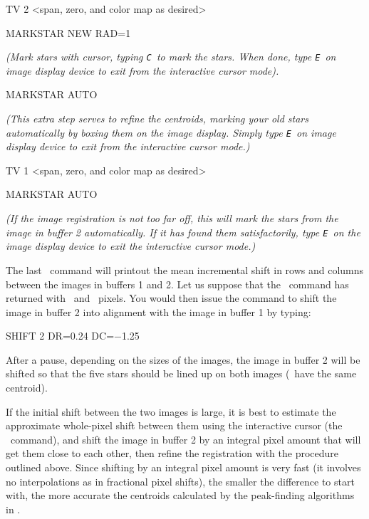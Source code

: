 \begin{command}
      \item TV 2 <span, zero, and color map as desired>
      \item MARKSTAR NEW RAD=1

            {\it (Mark stars with cursor, typing {\tt C}\ to mark
            the stars.  When done, type {\tt E}\ on image display device to 
            exit from the interactive cursor mode).}
      \item MARKSTAR AUTO

            {\it (This extra step serves to refine the centroids, marking 
            your old stars automatically by boxing them on the image
            display.  Simply type {\tt E}\ on image display device 
            to exit from the interactive cursor mode.)}
      \item TV 1 <span, zero, and color map as desired>
      \item MARKSTAR AUTO

            {\it (If the image registration is not too far off, this
            will mark the stars from the image in buffer 2 automatically.
            If it has found them satisfactorily, type {\tt E}\ on the
            image display device to exit the interactive cursor mode.)}
\end{command}
The last \ command will printout the mean incremental shift
in rows and columns between the images in buffers 1 and 2. Let us suppose that
the \ command has returned with \ and
\ pixels.  You would then issue the command to shift the
image in buffer 2 into alignment with the image in buffer 1 by typing: 
\begin{command}
      \item SHIFT 2 DR=0.24 DC=$-$1.25
\end{command}
After a pause, depending on the sizes of the images, the image in buffer 2
will be shifted so that the five stars should be lined up on both images
(\ie\ have the same centroid).

If the initial shift between the two images is large, it is best to estimate
the approximate whole-pixel shift between them using the interactive cursor
(the \ command), and shift the image in buffer 2 by an integral
pixel amount that will get them close to each other, then refine the
registration with the procedure outlined above.  Since shifting by an integral
pixel amount is very fast (it involves no interpolations as in fractional
pixel shifts), the smaller the difference to start with, the more accurate the
centroids calculated by the peak-finding algorithms in . 

